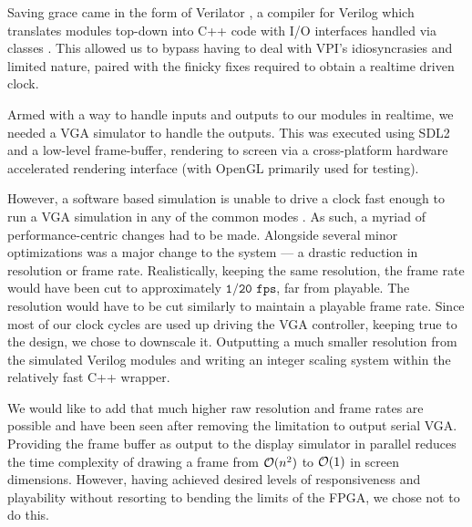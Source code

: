 Saving grace came in the form of Verilator \cite{verilator}, a compiler for
Verilog which translates modules top-down into C++ code with
I/O interfaces handled via classes \cite{verilator-implement}. This allowed
us to bypass having to deal with VPI's idiosyncrasies and limited nature, paired
with the finicky fixes required to obtain a realtime driven clock.

Armed with a way to handle inputs and outputs to our modules in realtime, we 
needed a VGA simulator to handle the outputs. This was executed using
SDL2 \cite{sdl2} and a low-level frame-buffer, rendering to screen via 
a cross-platform hardware accelerated rendering interface (with OpenGL \cite{opengl}
primarily used for testing).

However, a software based simulation is unable to drive a clock fast enough
to run a VGA simulation in any of the common modes \cite{vga_modes}. As such,
a myriad of performance-centric changes had to be made. Alongside several
minor optimizations was a major change to the system --- a drastic reduction in
resolution or frame rate. Realistically, keeping the same resolution, the frame 
rate would have been cut to approximately \(\texttt{1/20 fps}\), far from playable.
The resolution would have to be cut similarly to maintain a playable frame rate.
Since most of our clock cycles are used up driving the VGA controller, keeping true
to the design, we chose to downscale it. Outputting a much smaller resolution from
the simulated Verilog modules and writing an integer scaling \cite{intscale} system
within the relatively fast C++ wrapper. 

We would like to add that much higher raw resolution and frame rates are possible 
and have been seen after removing the limitation to output serial VGA. Providing
the frame buffer as output to the display simulator in parallel reduces the time
complexity of drawing a frame from \(\mathcal{O} (n^2)\) to \(\mathcal{O} (1)\) in screen 
dimensions. However, having achieved desired levels of responsiveness and 
playability without resorting to bending the limits of the FPGA, we chose not 
to do this.